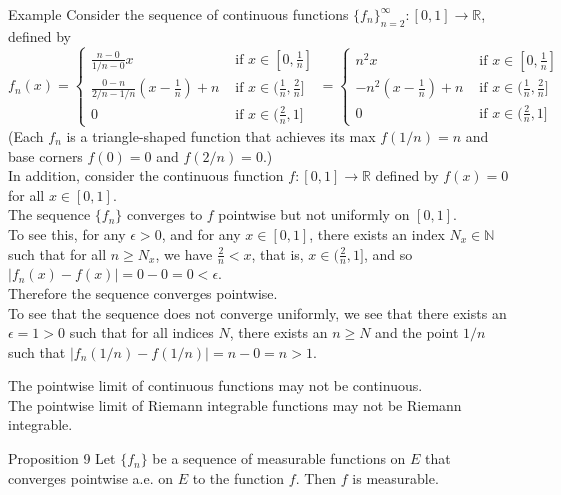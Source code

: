 \begin{flushleft}
    \begin{namedthm*}{Example}
        Consider the sequence of continuous functions $\{f_n\}_{n=2}^\infty:[0,1]\to\mathbb{R}$, defined by
        \[ 
		f_n(x) =
            \begin{cases} 
                \frac{n-0}{1/n-0}x& \text{ if } x \in [0,\frac{1}{n}]\\
                \frac{0-n}{2/n-1/n}(x-\frac{1}{n})+n & \text{ if } x \in (\frac{1}{n},\frac{2}{n}]\\
                0& \text{ if } x \in (\frac{2}{n},1]
            \end{cases}
            =
            \begin{cases} 
                n^2x& \text{ if } x \in [0,\frac{1}{n}]\\
                -n^2(x-\frac{1}{n})+n & \text{ if } x \in (\frac{1}{n},\frac{2}{n}]\\
                0& \text{ if } x \in (\frac{2}{n},1]
            \end{cases}
	    \]
        (Each $f_n$ is a triangle-shaped function that achieves its max $f(1/n)=n$ and base corners $f(0)=0$ and $f(2/n)=0$.)\\
        In addition, consider the continuous function $f:[0,1]\to\mathbb{R}$ defined by $f(x)=0$ for all $x\in[0,1]$.\\
        The sequence $\{f_n\}$ converges to $f$ pointwise but not uniformly on $[0,1]$.
        \\To see this, for any $\epsilon>0$, and for any $x\in[0,1]$, there exists an index $N_x\in\mathbb{N}$ such that for all $n\ge N_x$, we have $\frac{2}{n}<x$, that is, $x\in(\frac{2}{n},1]$, and so $|f_n(x)-f(x)|=0-0=0<\epsilon$.\\
        Therefore the sequence converges pointwise.\\
        To see that the sequence does not converge uniformly, we see that there exists an $\epsilon=1>0$ such that for all indices $N$, there exists an $n\ge N$ and the point $1/n$ such that $|f_n(1/n)-f(1/n)|=n-0=n>1$.
    \end{namedthm*}
    The pointwise limit of continuous functions may not be continuous.\\
    The pointwise limit of Riemann integrable functions may not be Riemann integrable.
    \begin{namedthm*}{Proposition 9}
        Let $\{f_n\}$ be a sequence of measurable functions on $E$ that converges pointwise a.e. on $E$ to the function $f$.
        Then $f$ is measurable.

\end{namedthm*}
\end{flushleft}
